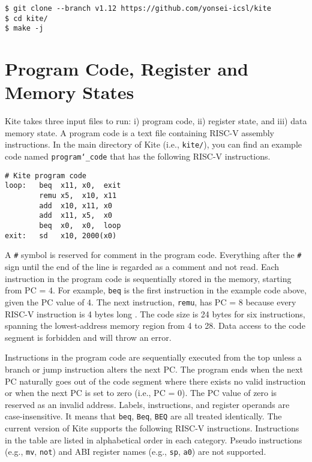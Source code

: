 \documentclass[10pt]{article}
\begin{document}
\begin{Verbatim}[frame=single,fontsize=\small]
$ git clone --branch v1.12 https://github.com/yonsei-icsl/kite
$ cd kite/
$ make -j
\end{Verbatim}


\section{Program Code, Register and Memory States} \label{sec:inputs}
Kite takes three input files to run: i) program code, ii) register state, and iii) data memory state.
A program code is a text file containing RISC-V assembly instructions.
In the main directory of Kite (i.e., {\tt\small kite/}), you can find an example code named {\tt\small program\char`_code} that has the following RISC-V instructions.

\begin{Verbatim}[frame=single,fontsize=\small]
# Kite program code
loop:   beq  x11, x0,  exit
        remu x5,  x10, x11
        add  x10, x11, x0
        add  x11, x5,  x0
        beq  x0,  x0,  loop
exit:   sd   x10, 2000(x0)
\end{Verbatim}

A {\tt\small \#} symbol is reserved for comment in the program code.
Everything after the {\tt\small \#} sign until the end of the line is regarded as a comment and not read.
Each instruction in the program code is sequentially stored in the memory, starting from PC = 4.
For example, {\tt\small beq} is the first instruction in the example code above, given the PC value of 4.
The next instruction, {\tt\small remu}, has PC = 8 because every RISC-V instruction is 4 bytes long \cite{waterman_riscv2019}.
The code size is 24 bytes for six instructions, spanning the lowest-address memory region from 4 to 28.
Data access to the code segment is forbidden and will throw an error.

Instructions in the program code are sequentially executed from the top unless a branch or jump instruction alters the next PC.
The program ends when the next PC naturally goes out of the code segment where there exists no valid instruction or when the next PC is set to zero (i.e., PC = 0).
The PC value of zero is reserved as an invalid address.
Labels, instructions, and register operands are case-insensitive.
It means that {\tt\small beq}, {\tt\small Beq}, {\tt\small BEQ} are all treated identically.
The current version of Kite supports the following RISC-V instructions.
Instructions in the table are listed in alphabetical order in each category.
Pseudo instructions (e.g., {\tt\small mv}, {\tt\small not}) and ABI register names (e.g., {\tt\small sp}, {\tt\small a0}) are not supported.
\end{document}
